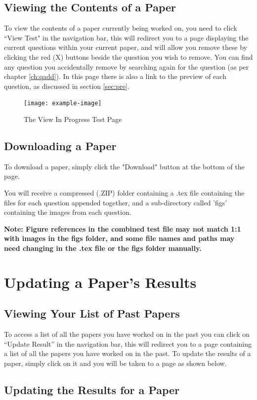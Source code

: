 \documentclass[12pt, a4paper, titlepage]{book}
\begin{document}
\section{Viewing the Contents of a Paper}
To view the contents of a paper currently being worked on, you need to click ``View Test" in the navigation bar, this will redirect you to a page displaying the current questions within your current paper, and will allow you remove these by clicking the red (X) buttons beside the question you wish to remove. You can find any question you accidentally remove by searching again for the question (as per chapter \ref{ch:qadd}). In this page there is also a link to the preview of each question, as discussed in section \ref{sec:pre}.\par
\begin{figure}[htp]
\centering
\texttt{[image: example-image]}
\caption{The View In Progress Test Page}
\end{figure}

\section{Downloading a Paper}
To download a paper, simply click the "Download" button at the bottom of the page. \par You will receive a compressed (.ZIP) folder containing a .tex file containing the files for each question appended together, and a sub-directory called 'figs' containing the images from each question.
\par \textbf{Note: Figure references in the combined test file may not match 1:1 with images in the figs folder, and some file names and paths may need changing in the .tex file or the figs folder manually.}


\chapter{Updating a Paper's Results}\label{ch:upres}
\section{Viewing Your List of Past Papers}
To access a list of all the papers you have worked on in the past you can click on ``Update Result'' in the navigation bar, this will redirect you to a page containing a list of all the papers you have worked on in the past. To update the results of a paper, simply click on it and you will be taken to a page as shown below.

\section{Updating the Results for a Paper}
\end{document}
